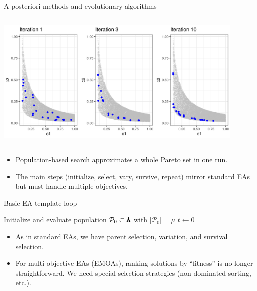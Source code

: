 \documentclass[11pt,compress,t,notes=noshow,xcolor=table]{beamer}
\newcommand{\XX}{\pcs}     %
\begin{document}
\begin{vbframe}{A-posteriori methods and evolutionary algorithms}
\begin{columns}
\begin{column}{0.7\textwidth}
\begin{center}
\includegraphics[width=0.9\textwidth]{slides/11-multicrit/figure_man/NSGA2_steps.png}
\end{center}
\end{column}
\end{columns}

\bigskip
\begin{itemize}
\item Population-based search approximates a whole Pareto set in one run.
\item The main steps (initialize, select, vary, survive, repeat) mirror standard EAs but must handle multiple objectives.
\end{itemize}

\end{vbframe}

\begin{vbframe}{Basic EA template loop}

\begin{algorithm2e}[H]
\SetAlgoLined         %
\caption{Basic EA template loop (algo2e style)}


Initialize and evaluate population $\mathcal{P}_0 \subset \XX$ with $|\mathcal{P}_0| = \mu$\;
$t \gets 0$\;

\end{algorithm2e}


\bigskip
\begin{itemize}
  \item As in standard EAs, we have parent selection, variation, and survival selection.
  \item For multi-objective EAs (EMOAs), ranking solutions by “fitness” is no longer straightforward. We need special selection strategies (non-dominated sorting, etc.).
\end{itemize}

\end{vbframe}
\end{document}
